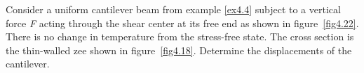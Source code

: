 \documentclass{AeroStructure-ERJohnson}
\begin{document}
\begin{example}\label{ex4.6}\setcounter{equation}{0}\def\theequation{\alph{equation}}%
Consider a uniform cantilever beam from example \ref{ex4.4} subject to a vertical force \textit{F} acting through the shear center at its free end as shown in figure~\ref{fig4.22}. There is no change in temperature from the stress-free state. The cross section is the thin-walled zee shown in figure~\ref{fig4.18}. Determine the displacements of the cantilever.

{\def\thefigure{4.22}
}


\end{example}
\end{document}
